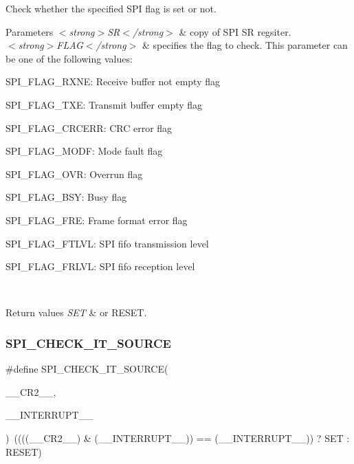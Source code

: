 Check whether the specified S\+PI flag is set or not. 


\begin{DoxyParams}{Parameters}
{\em $<$strong$>$\+S\+R$<$/strong$>$} & copy of S\+PI SR regsiter. \\
\hline
{\em $<$strong$>$\+F\+L\+A\+G$<$/strong$>$} & specifies the flag to check. This parameter can be one of the following values\+: \begin{DoxyItemize}
\item S\+P\+I\+\_\+\+F\+L\+A\+G\+\_\+\+R\+X\+NE\+: Receive buffer not empty flag \item S\+P\+I\+\_\+\+F\+L\+A\+G\+\_\+\+T\+XE\+: Transmit buffer empty flag \item S\+P\+I\+\_\+\+F\+L\+A\+G\+\_\+\+C\+R\+C\+E\+RR\+: C\+RC error flag \item S\+P\+I\+\_\+\+F\+L\+A\+G\+\_\+\+M\+O\+DF\+: Mode fault flag \item S\+P\+I\+\_\+\+F\+L\+A\+G\+\_\+\+O\+VR\+: Overrun flag \item S\+P\+I\+\_\+\+F\+L\+A\+G\+\_\+\+B\+SY\+: Busy flag \item S\+P\+I\+\_\+\+F\+L\+A\+G\+\_\+\+F\+RE\+: Frame format error flag \item S\+P\+I\+\_\+\+F\+L\+A\+G\+\_\+\+F\+T\+L\+VL\+: S\+PI fifo transmission level \item S\+P\+I\+\_\+\+F\+L\+A\+G\+\_\+\+F\+R\+L\+VL\+: S\+PI fifo reception level \end{DoxyItemize}
\\
\hline
\end{DoxyParams}

\begin{DoxyRetVals}{Return values}
{\em S\+ET} & or R\+E\+S\+ET. \\
\hline
\end{DoxyRetVals}
\mbox{\label{group___s_p_i___private___macros_ga8ab087388d8930531498165ac8f066a2}} 
\subsubsection{\texorpdfstring{SPI\_CHECK\_IT\_SOURCE}{SPI\_CHECK\_IT\_SOURCE}}
{\footnotesize\ttfamily \#define S\+P\+I\+\_\+\+C\+H\+E\+C\+K\+\_\+\+I\+T\+\_\+\+S\+O\+U\+R\+CE(\begin{DoxyParamCaption}\item[{}]{\+\_\+\+\_\+\+C\+R2\+\_\+\+\_\+,  }\item[{}]{\+\_\+\+\_\+\+I\+N\+T\+E\+R\+R\+U\+P\+T\+\_\+\+\_\+ }\end{DoxyParamCaption})~((((\+\_\+\+\_\+\+C\+R2\+\_\+\+\_\+) \& (\+\_\+\+\_\+\+I\+N\+T\+E\+R\+R\+U\+P\+T\+\_\+\+\_\+)) == (\+\_\+\+\_\+\+I\+N\+T\+E\+R\+R\+U\+P\+T\+\_\+\+\_\+)) ? S\+ET \+: R\+E\+S\+ET)}



